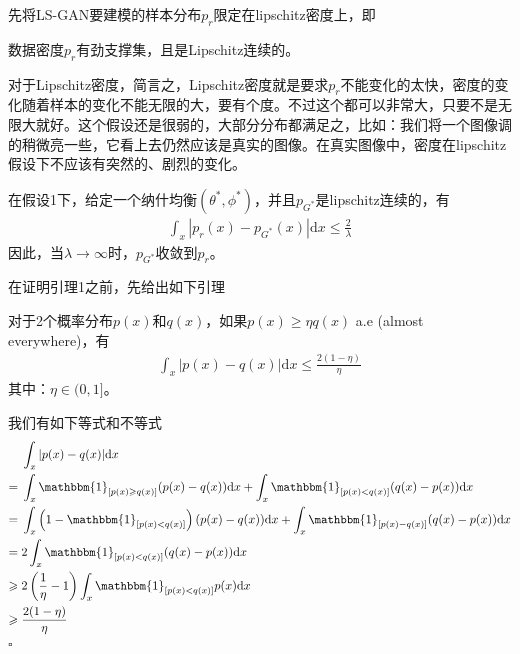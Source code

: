             \par
            先将LS-GAN要建模的样本分布$p_r$限定在lipschitz密度上，即
            \begin{Assumption}[1]
            数据密度$p_r$有劲支撑集，且是Lipschitz连续的。
            \end{Assumption}
            \par
            对于Lipschitz密度，简言之，Lipschitz密度就是要求$p_r$不能变化的太快，密度的变化随着样本的变化不能无限的大，要有个度。不过这个都可以非常大，只要不是无限大就好。这个假设还是很弱的，大部分分布都满足之，比如：我们将一个图像调的稍微亮一些，它看上去仍然应该是真实的图像。在真实图像中，密度在lipschitz假设下不应该有突然的、剧烈的变化。
            \begin{lemma}[1]
            在假设1下，给定一个纳什均衡$(\theta^*,\phi^*)$，并且$p_{G^*}$是lipschitz连续的，有
            \begin{align*}
            \int_x|p_r(x) - p_{G^*}(x)|\mathrm{d}x \leqslant \frac{2}{\lambda}
            \end{align*}
            因此，当$\lambda\to \infty$时，$p_{G^*}$收敛到$p_r$。
            \end{lemma}
            \par
            在证明引理1之前，先给出如下引理
            \begin{lemma}[4]
            对于2个概率分布$p(x)$和$q(x)$，如果$p(x) \geqslant \eta q(x)$ a.e (almost everywhere)，有
            \begin{align*}
            \int_x|p(x) - q(x)|\mathrm{d}x \leqslant \frac{2(1-\eta)}{\eta}
            \end{align*}
            其中：$\eta\in (0,1]$。
            \end{lemma}
            \begin{Proof}
            我们有如下等式和不等式
            \begin{align*}
            & \int_x|p(x) - q(x)|\mathrm{d}x\\
            ={}&\int_x\mathbbm{1}_{[p(x)\geqslant q(x)]}(p(x)-q(x))\mathrm{d}x+\int_x \mathbbm{1}_{[p(x)<q(x)]}(q(x)-p(x))\mathrm{d}x\\
            ={}& \int_x \left( 1-\mathbbm{1}_{[p(x)<q(x)]} \right) (p(x) - q(x))\mathrm{d}x + \int_x \mathbbm{1}_{[p(x) - q(x)]}(q(x) - p(x))\mathrm{d}x\\
            ={}&2\int_x \mathbbm{1}_{[p(x)<q(x)]}(q(x)-p(x))\mathrm{d}x\\
            \geqslant{}&2 \left( \frac{1}{\eta} - 1 \right) \int_x \mathbbm{1}_{[p(x)<q(x)]}p(x)\mathrm{d}x\\
            \geqslant{}& \frac{2(1-\eta)}{\eta}
            \end{align*}
            $\square$
            \end{Proof}
